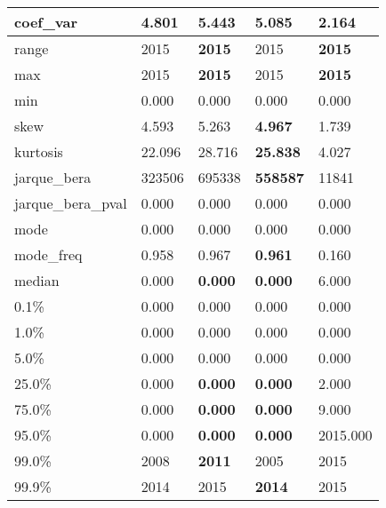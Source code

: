 \begin{table}[H]
\begin{tabular}{|l|m{10em}|m{10em}|m{10em}|m{10em}|}
\hline coef\_var & 4.801 & 5.443 & \bfseries 5.085 & \cellcolor[rgb]{0.9, 0.54, 0.52} 2.164 \\
\hline range & 2015 & \bfseries 2015 & \cellcolor[rgb]{0.9, 0.54, 0.52} 2015 & \bfseries 2015 \\
\hline max & 2015 & \bfseries 2015 & \cellcolor[rgb]{0.9, 0.54, 0.52} 2015 & \bfseries 2015 \\
\hline min & 0.000 & 0.000 & 0.000 & 0.000 \\
\hline skew & 4.593 & 5.263 & \bfseries 4.967 & \cellcolor[rgb]{0.9, 0.54, 0.52} 1.739 \\
\hline kurtosis & 22.096 & 28.716 & \bfseries 25.838 & \cellcolor[rgb]{0.9, 0.54, 0.52} 4.027 \\
\hline jarque\_bera & 323506 & \cellcolor[rgb]{0.9, 0.54, 0.52} 695338 & \bfseries 558587 & 11841 \\
\hline jarque\_bera\_pval & 0.000 & 0.000 & 0.000 & 0.000 \\
\hline mode & 0.000 & 0.000 & 0.000 & 0.000 \\
\hline mode\_freq & 0.958 & 0.967 & \bfseries 0.961 & \cellcolor[rgb]{0.9, 0.54, 0.52} 0.160 \\
\hline median & 0.000 & \bfseries 0.000 & \bfseries 0.000 & \cellcolor[rgb]{0.9, 0.54, 0.52} 6.000 \\
\hline 0.1\% & 0.000 & 0.000 & 0.000 & 0.000 \\
\hline 1.0\% & 0.000 & 0.000 & 0.000 & 0.000 \\
\hline 5.0\% & 0.000 & 0.000 & 0.000 & 0.000 \\
\hline 25.0\% & 0.000 & \bfseries 0.000 & \bfseries 0.000 & \cellcolor[rgb]{0.9, 0.54, 0.52} 2.000 \\
\hline 75.0\% & 0.000 & \bfseries 0.000 & \bfseries 0.000 & \cellcolor[rgb]{0.9, 0.54, 0.52} 9.000 \\
\hline 95.0\% & 0.000 & \bfseries 0.000 & \bfseries 0.000 & \cellcolor[rgb]{0.9, 0.54, 0.52} 2015.000 \\
\hline 99.0\% & 2008 & \bfseries 2011 & 2005 & \cellcolor[rgb]{0.9, 0.54, 0.52} 2015 \\
\hline 99.9\% & 2014 & 2015 & \bfseries 2014 & \cellcolor[rgb]{0.9, 0.54, 0.52} 2015 \\
\hline
\end{tabular}
\end{table}
